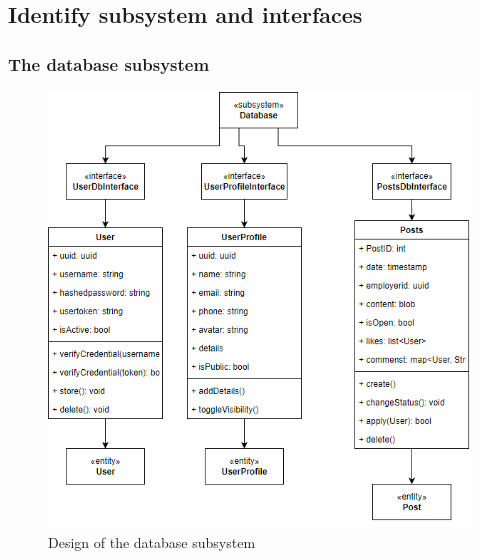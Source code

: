 \documentclass[a4paper]{article}
\begin{document}
\subsection{Identify subsystem and interfaces}
\subsubsection{The database subsystem}
\begin{figure}[H]
  \centering
  \includegraphics[width=1.0\textwidth]{database_subsystem.png}
  \caption{Design of the database subsystem}
  \label{fig:fig32}
\end{figure}
\end{document}
